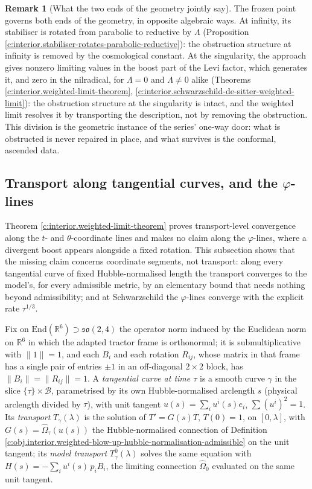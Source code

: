 \documentclass[11pt]{article}
\theoremstyle{definition}
\newtheorem{remark}[theorem]{Remark}
\theoremstyle{plain}
\providecommand{\R}{}\renewcommand{\R}{\mathbb{R}}
\begin{document}
\begin{remark}[What the two ends of the geometry jointly say]\label{c:note.interior.what-two-ends-geometry-jointly-say}
The frozen point governs both ends of the geometry, in opposite algebraic ways. At infinity, its stabiliser is rotated from parabolic to reductive by $\Lambda$ (Proposition \ref{c:interior.stabiliser-rotates-parabolic-reductive}): the obstruction structure at infinity is removed by the cosmological constant. At the singularity, the approach gives nonzero limiting values in the boost part of the Levi factor, which generates it, and zero in the nilradical, for $\Lambda = 0$ and $\Lambda \neq 0$ alike (Theorems \ref{c:interior.weighted-limit-theorem}, \ref{c:interior.schwarzschild-de-sitter-weighted-limit}): the obstruction structure at the singularity is intact, and the weighted limit resolves it by transporting the description, not by removing the obstruction. This division is the geometric instance of the series' one-way door: what is obstructed is never repaired in place, and what survives is the conformal, ascended data.
\end{remark}

\subsection*{Transport along tangential curves, and the $\varphi$-lines}
\label{c:note.interior.setting-transport-along-tangential-curves-lines}
Theorem \ref{c:interior.weighted-limit-theorem} proves transport-level convergence along the $t$- and $\theta$-coordinate lines and makes no claim along the $\varphi$-lines, where a divergent boost appears alongside a fixed rotation. This subsection shows that the missing claim concerns coordinate segments, not transport: along every tangential curve of fixed Hubble-normalised length the transport converges to the model's, for every admissible metric, by an elementary bound that needs nothing beyond admissibility; and at Schwarzschild the $\varphi$-lines converge with the explicit rate $\tau^{1/3}$.

Fix on $\mathrm{End}(\R^{6}) \supset \mathfrak{so}(2,4)$ the operator norm induced by the Euclidean norm on $\R^{6}$ in which the adapted tractor frame is orthonormal; it is submultiplicative with $\|1\| = 1$, and each $B_i$ and each rotation $R_{ij}$, whose matrix in that frame has a single pair of entries $\pm 1$ in an off-diagonal $2 \times 2$ block, has $\|B_i\| = \|R_{ij}\| = 1$. A \emph{tangential curve at time $\tau$} is a smooth curve $\gamma$ in the slice $\{\tau\} \times \mathcal{B}$, parametrised by its own Hubble-normalised arclength $s$ (physical arclength divided by $\tau$), with unit tangent $u(s) = \sum_{i} u^{i}(s) e_{i}$, $\sum (u^{i})^{2} = 1$. Its \emph{transport} $T_{\gamma}(\lambda)$ is the solution of $T' = G(s) T$, $T(0) = 1$, on $[0, \lambda]$, with $G(s) = \widehat\Omega_{\tau}(u(s))$ the Hubble-normalised connection of Definition \ref{c:obj.interior.weighted-blow-up-hubble-normalisation-admissible} on the unit tangent; its \emph{model transport} $T^{0}_{\gamma}(\lambda)$ solves the same equation with $H(s) = -\sum_{i} u^{i}(s)\, p_{i} B_{i}$, the limiting connection $\widehat\Omega_0$ evaluated on the same unit tangent.
\end{document}
